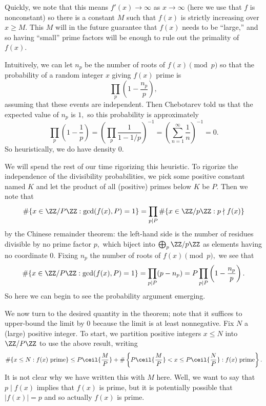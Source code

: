 Quickly, we note that this means $f'(x)\to\infty$ as $x\to\infty$ (here we use that $f$ is nonconstant) so there is a constant $M$ such that $f(x)$ is strictly increasing over $x\ge M.$ This $M$ will in the future guarantee that $f(x)$ needs to be ``large,'' and so having ``small'' prime factors will be enough to rule out the primality of $f(x).$

Intuitively, we can let $n_p$ be the number of roots of $f(x)\pmod p$ so that the probability of a random integer $x$ giving $f(x)$ prime is
\[\prod_p\left(1-\frac{n_p}p\right),\]
assuming that these events are independent. Then Chebotarev told us that the expected value of $n_p$ is $1,$ so this probability is approximately
\[\prod_p\left(1-\frac1p\right)=\left(\prod_p\frac1{1-1/p}\right)^{-1}=\left(\sum_{n=1}^\infty\frac1n\right)^{-1}=0.\]
So heuristically, we do have density $0.$

We will spend the rest of our time rigorizing this heuristic. To rigorize the independence of the divisibility probabilities, we pick some positive constant named $K$ and let the product of all (positive) primes below $K$ be $P.$ Then we note that
\[\#\{x\in\ZZ/P\ZZ:\gcd(f(x),P)=1\}=\prod_{p\mid P}\#\{x\in\ZZ/p\ZZ:p\nmid f(x)\}\]
by the Chinese remainder theorem: the left-hand side is the number of residues divisible by no prime factor $p,$ which biject into $\bigoplus_p\ZZ/p\ZZ$ as elements having no coordinate $0.$ Fixing $n_p$ the number of roots of $f(x)\pmod p,$ we see that
\[\#\{x\in\ZZ/P\ZZ:\gcd(f(x),P)=1\}=\prod_{p\mid P}(p-n_p)=P\prod_{p\mid P}\left(1-\frac{n_p}p\right).\]
So here we can begin to see the probability argument emerging.

We now turn to the desired quantity in the theorem; note that it suffices to upper-bound the limit by $0$ because the limit is at least nonnegative. Fix $N$ a (large) positive integer. To start, we partition positive integers $x\le N$ into $\ZZ/P\ZZ$ to use the above result, writing
\[\#\{x\le N:f(x)\text{ prime}\}\le P\ceil{\frac MP}+\#\left\{P\ceil{\frac MP}<x\le P\ceil{\frac NP}:f(x)\text{ prime}\right\}.\]
It is not clear why we have written this with $M$ here. Well, we want to say that $p\mid f(x)$ implies that $f(x)$ is prime, but it is potentially possible that $|f(x)|=p$ and so actually $f(x)$ is prime.

